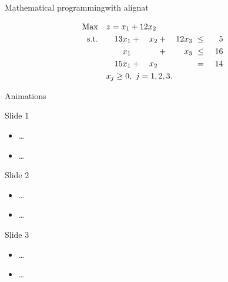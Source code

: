 \begin{frame}{Mathematical programming}{with alignat}
\begin{scriptsize}
        \begin{alignat}{5}   %
            \text{Max}  \quad \rlap{$z = x_1 + 12x_2$}                                  \nonumber  \\
            \text{s.t.} \quad & & 13 x_1 & {}+{} & x_2 & {}+{} & 12 x_3 & ~ \leq ~ & 5  \label{c1} \\
                              & &    x_1 &       &     & {}+{} &    x_3 & ~ \leq ~ & 16 \label{c2} \\
                              & & 15 x_1 & {}+{} & x_2 &       &        & ~ =    ~ & 14 \label{c3} \\
                              & \rlap{$x_j \geq 0, ~ j=1,2,3.$}                         \nonumber
        \end{alignat}
    \end{scriptsize}

\end{frame}
\note{
}


\begin{frame}{Animations}
     {
        Slide 1
        \begin{itemize}
            \item \dots
            \item \dots
        \end{itemize}
    }

     {
        Slide 2
        \begin{itemize}
            \item \dots
            \item \dots
        \end{itemize}
    }

     {
        Slide 3
        \begin{itemize}
            \item \dots
            \item \dots
        \end{itemize}
    }
\end{frame}
\note{
}

